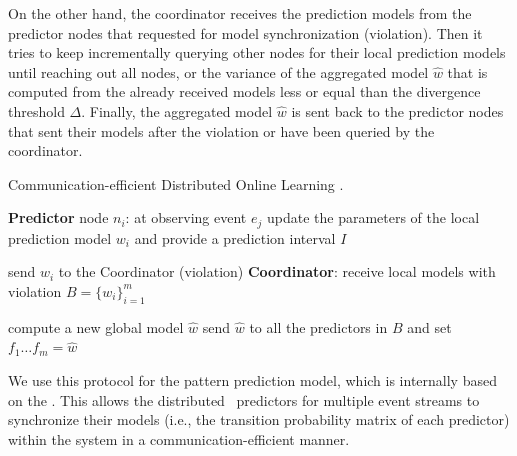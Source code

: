 \par On the other hand, the coordinator receives the prediction models from the predictor nodes that requested for model synchronization (violation). Then it tries to keep incrementally querying other nodes for their local prediction models until reaching out all nodes, or the variance of the aggregated model $\hat{w}$ that is computed from the already received models less or equal than the divergence threshold  $\Delta$. Finally, the aggregated model $\hat{w}$ is sent back to the predictor nodes that sent their models after the violation or have been queried by the coordinator.

\begin{algorithm}[h]
	\caption{Communication-efficient Distributed Online Learning \cite{kamp2014communication}.} 
	\begin{algorithmic}[1] 
	
		\Statex \Indm  \textbf{Predictor} node $n_i$: at observing event $e_j$
		\Statex \Indp update the parameters of the local prediction model $w_i$ and provide a prediction interval $I$ \; 

		\Statex {}  
		\Statex send  $w_i$ to the Coordinator (violation) \;
		\Statex \Indm \textbf{Coordinator}:
		\Statex \Indp receive local models with violation 
		 $B=\{w_i\}_{i=1}^m$ \;
	
	
		\Statex {}
        \Statex
		\Statex compute a new global model $\hat{w}$ \;
		\Statex send $\hat{w}$ to all the predictors in $B$ and set $f_{1}\dots f_{m}=\hat{w} $\; 
		\Statex {}
	
	\end{algorithmic}
	\label{algonline:dol}
\end{algorithm}


\par  We use this protocol for the pattern prediction model, which is internally based on the \pmcmr. This allows the distributed \pmcmr\ predictors for multiple event streams to  synchronize their models (i.e., the transition probability matrix of each predictor) within the system in a communication-efficient manner. 



